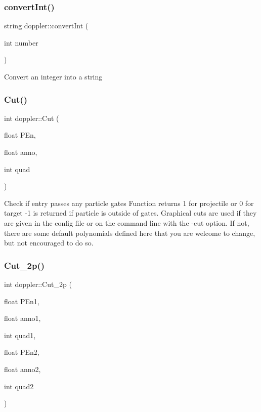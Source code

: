 \subsubsection{\texorpdfstring{convert\+Int()}{convertInt()}}
{\footnotesize\ttfamily string doppler\+::convert\+Int (\begin{DoxyParamCaption}\item[{int}]{number }\end{DoxyParamCaption})\hspace{0.3cm}{\ttfamily [static]}}

Convert an integer into a string \mbox{\label{classdoppler_aa3debb227d73f7cdea5b02e4c202cb19}} 
\subsubsection{\texorpdfstring{Cut()}{Cut()}}
{\footnotesize\ttfamily int doppler\+::\+Cut (\begin{DoxyParamCaption}\item[{float}]{P\+En,  }\item[{float}]{anno,  }\item[{int}]{quad }\end{DoxyParamCaption})}

Check if entry passes any particle gates Function returns 1 for projectile or 0 for target -\/1 is returned if particle is outside of gates. Graphical cuts are used if they are given in the config file or on the command line with the -\/cut option. If not, there are some default polynomials defined here that you are welcome to change, but not encouraged to do so. \mbox{\label{classdoppler_a52f116733da78465469a75ced66915a8}} 
\subsubsection{\texorpdfstring{Cut\+\_\+2p()}{Cut\_2p()}}
{\footnotesize\ttfamily int doppler\+::\+Cut\+\_\+2p (\begin{DoxyParamCaption}\item[{float}]{P\+En1,  }\item[{float}]{anno1,  }\item[{int}]{quad1,  }\item[{float}]{P\+En2,  }\item[{float}]{anno2,  }\item[{int}]{quad2 }\end{DoxyParamCaption})}

